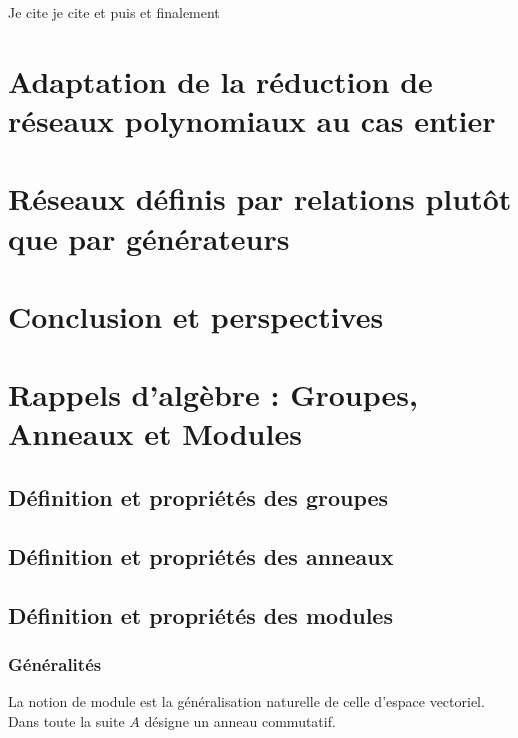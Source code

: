 \documentclass[a4paper,12pt]{report}  %
\theoremstyle{definitionstyle}
\theoremstyle{examplestyle}
\theoremstyle{remarkstyle}
\begin{document}
	Je cite \cite{clef_unique_1}  je cite \cite{clef_unique_2} et puis \cite{clef_unique_3} et finalement \cite{clef_unique_4}
	
	\chapter{Adaptation de la réduction de réseaux polynomiaux au cas entier}
	
	\chapter{Réseaux définis par relations plutôt que par générateurs}
	\chapter*{Conclusion et perspectives}
	
	\appendix
	\chapter{Rappels d'algèbre : Groupes, Anneaux et Modules}

	\section{Définition et propriétés des groupes}
	
	\section{Définition et propriétés des anneaux}
	\section{Définition et propriétés des modules} %
	
	\subsection{Généralités}
	
	La notion de module est la généralisation naturelle de celle d'espace vectoriel. Dans toute la suite $A$ désigne un anneau commutatif.
	
\end{document}
